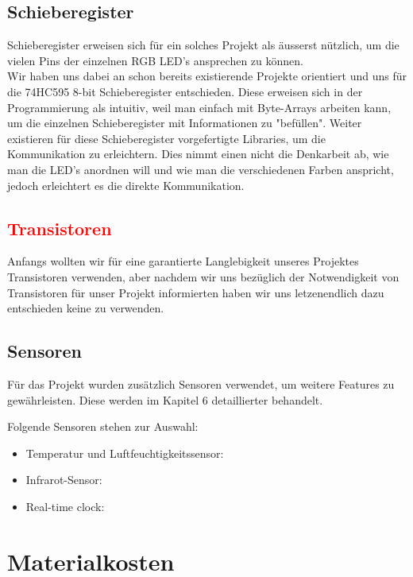 \documentclass[12pt,a4paper]{article}
\begin{document}
\subsection{Schieberegister}

Schieberegister erweisen sich für ein solches Projekt als äusserst nützlich, um die vielen Pins der einzelnen RGB LED's ansprechen zu können. \\

Wir haben uns dabei an schon bereits existierende Projekte orientiert und uns für die 74HC595 8-bit Schieberegister entschieden. Diese erweisen sich in der Programmierung als intuitiv, weil man einfach mit Byte-Arrays arbeiten kann, um die einzelnen Schieberegister mit Informationen zu "befüllen". Weiter existieren für diese Schieberegister vorgefertigte Libraries, um die Kommunikation zu erleichtern. Dies nimmt einen nicht die Denkarbeit ab, wie man die LED's anordnen will und wie man die verschiedenen Farben anspricht, jedoch erleichtert es die direkte Kommunikation.

\subsection{\textcolor{red}{Transistoren}}

Anfangs wollten wir für eine garantierte Langlebigkeit unseres Projektes Transistoren verwenden, aber nachdem wir uns bezüglich der Notwendigkeit
von Transistoren für unser Projekt informierten haben wir uns letzenendlich dazu entschieden keine zu verwenden.

\subsection{Sensoren}

Für das Projekt wurden zusätzlich Sensoren verwendet, um weitere Features zu gewährleisten. Diese werden im Kapitel 6 detaillierter behandelt.

Folgende Sensoren stehen zur Auswahl:
\begin{itemize}
    \item Temperatur und Luftfeuchtigkeitssensor:
    \item Infrarot-Sensor:
    \item Real-time clock:
\end{itemize}

\section{Materialkosten}
\end{document}
